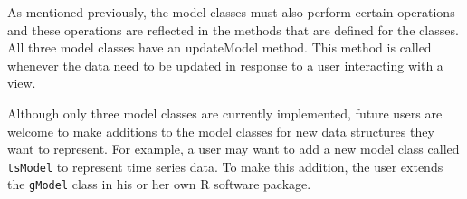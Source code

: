 \documentclass[11pt]{article}
\newcommand{\Rfunction}[1]{{\textsf{#1}}}
\newcommand{\Rpackage}[1]{{\textit{#1}}}
\newcommand{\Rslot}[1]{\textsl{#1}}
\newcommand{\Rclass}[1]{\texttt{#1}}
\begin{document}





As mentioned previously, the model classes must also perform certain
operations and these operations are reflected in the methods that are
defined for the classes.  All three model classes have an
\Rfunction{updateModel} method.  This method is called whenever the
data need to be updated in response to a user interacting with a view.

Although only three model classes are currently implemented, future
users are welcome to make additions to the model classes for new data
structures they want to represent.  For example, a user may want to add a new
model class called \Rclass{tsModel} to represent time series data.
To make this addition, the user extends the \Rclass{gModel} class in his or
her own R software package. 
\end{document}
